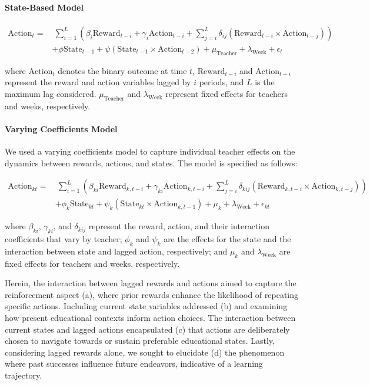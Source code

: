 \documentclass[
  number,
  preprint,
  3p,
  onecolumn]{elsarticle}
\let\oldparagraph\paragraph
\renewcommand{\paragraph}[1]{\oldparagraph{#1}\mbox{}}
\begin{document}
\paragraph{State-Based Model}\label{state-based-model}

\begin{align*}
\text{Action}_t =& \ \sum_{i=1}^{L} \left( \beta_{i} \text{Reward}_{t-i} + \gamma_i \text{Action}_{t-i} + \sum_{j=i}^{L} \delta_{ij} (\text{Reward}_{t-i} \times \text{Action}_{t-j}) \right) \\
& + \phi \text{State}_{t-1} + \psi (\text{State}_{t-1} \times \text{Action}_{t-2}) + \mu_{\text{Teacher}} + \lambda_{\text{Week}} + \epsilon_t
\end{align*}

where \(\text{Action}_t\) denotes the binary outcome at time \(t\),
\(\text{Reward}_{t-i}\) and \(\text{Action}_{t-i}\) represent the reward
and action variables lagged by \(i\) periods, and \(L\) is the maximum
lag considered. \(\mu_{\text{Teacher}}\) and \(\lambda_{\text{Week}}\)
represent fixed effects for teachers and weeks, respectively.

\paragraph{Varying Coefficients Model}\label{varying-coefficients-model}

We used a varying coefficients model to capture individual teacher
effects on the dynamics between rewards, actions, and states. The model
is specified as follows:

\begin{align*}
\text{Action}_{kt} =& \ \sum_{i=1}^{L} \left( \beta_{ki} \text{Reward}_{k, t-i} + \gamma_{ki} \text{Action}_{k, t-i} + \sum_{j=i}^{L} \delta_{kij} (\text{Reward}_{k, t-i} \times \text{Action}_{k, t-j}) \right) \\
& + \phi_k \text{State}_{kt} + \psi_k (\text{State}_{kt} \times \text{Action}_{k, t-1}) + \mu_k + \lambda_{\text{Week}} + \epsilon_{kt}
\end{align*}

where \(\beta_{ki}\), \(\gamma_{ki}\), and \(\delta_{kij}\) represent
the reward, action, and their interaction coefficients that vary by
teacher; \(\phi_k\) and \(\psi_k\) are the effects for the state and the
interaction between state and lagged action, respectively; and \(\mu_k\)
and \(\lambda_{\text{Week}}\) are fixed effects for teachers and weeks,
respectively.

Herein, the interaction between lagged rewards and actions aimed to
capture the reinforcement aspect (a), where prior rewards enhance the
likelihood of repeating specific actions. Including current state
variables addressed (b) and examining how present educational contexts
inform action choices. The interaction between current states and lagged
actions encapsulated (c) that actions are deliberately chosen to
navigate towards or sustain preferable educational states. Lastly,
considering lagged rewards alone, we sought to elucidate (d) the
phenomenon where past successes influence future endeavors, indicative
of a learning trajectory.
\end{document}
